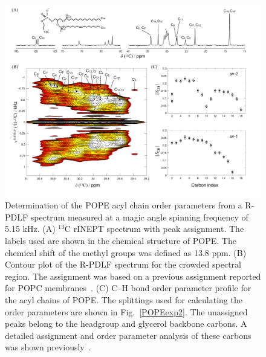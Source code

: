 \documentclass[fleqn,10pt]{wlscirepSI}
\begin{document}
\begin{figure}[h]
  \includegraphics[width=\textwidth]{Figures/POPE_INEPT_contour_SCH.pdf}
  \caption{Determination of the POPE acyl chain order parameters from a R-PDLF spectrum measured at a magic angle spinning frequency of 5.15 kHz. (A) $^{13}$C rINEPT spectrum with peak assignment. The labels used are shown in the chemical structure of POPE. The chemical shift of the methyl groups was defined as 13.8 ppm. (B) Contour plot of the R-PDLF spectrum for the crowded spectral region. The assignment was based on a previous assignment reported for POPC membranes~\cite{ferreira13}. (C) C--H bond order parameter profile for the acyl chains of POPE. The splittings used for calculating the order parameters are shown in Fig.~\ref{POPEexp2}. The unassigned peaks belong to the headgroup and glycerol backbone carbons. A detailed assignment and order parameter analysis of these carbons was shown previously~\cite{bacle21}.      }
  \label{POPEexp1}
\end{figure}
\end{document}
